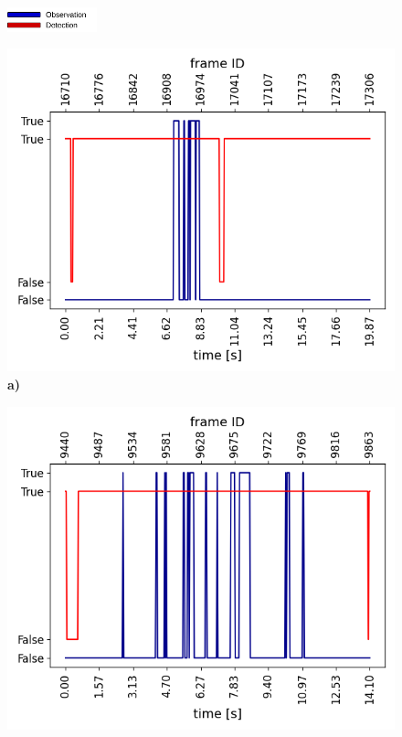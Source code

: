 \begin{figure}
    \raggedright
    \includegraphics[width=0.23\textwidth]{images/dreyeve/gazes/glances_legend.png}\\
    \centering
    \begin{minipage}{0.5\textwidth}
        \centering
        \includegraphics[width=\textwidth]{images/dreyeve/gazes/1.png}
        \textbf{a)}
    \end{minipage}\hfill
    \begin{minipage}{0.5\textwidth}
        \centering
        \includegraphics[width=\textwidth]{images/dreyeve/gazes/2.png}

\end{minipage}
\end{figure}
